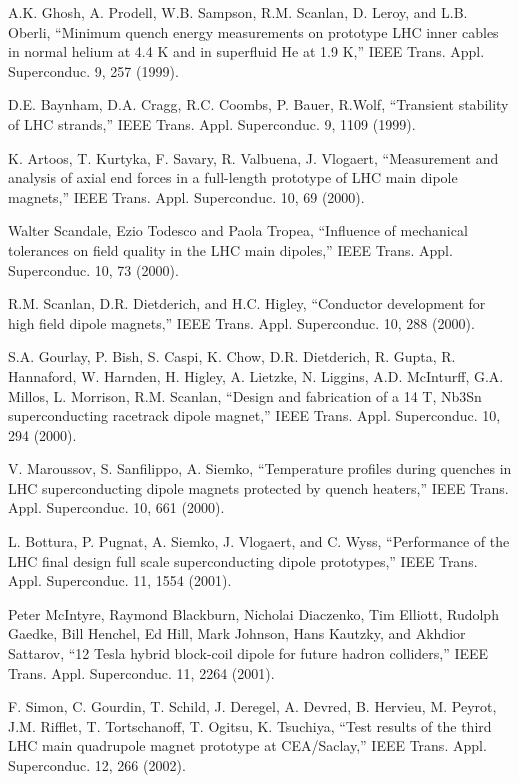 \noindent [9.318] A.K. Ghosh, A. Prodell, W.B. Sampson, R.M. Scanlan, D. Leroy, and L.B. Oberli,
``Minimum quench energy measurements on prototype LHC inner cables in normal
helium at 4.4 K and in superfluid He at 1.9 K,” IEEE Trans. Appl. Superconduc.
9, 257 (1999).

\noindent [9.319] D.E. Baynham, D.A. Cragg, R.C. Coombs, P. Bauer, R.Wolf, ``Transient stability
of LHC strands,” IEEE Trans. Appl. Superconduc. 9, 1109 (1999).

\noindent [9.320] K. Artoos, T. Kurtyka, F. Savary, R. Valbuena, J. Vlogaert, ``Measurement and
analysis of axial end forces in a full-length prototype of LHC main dipole magnets,” IEEE Trans. Appl. Superconduc. 10, 69 (2000).

\noindent [9.321] Walter Scandale, Ezio Todesco and Paola Tropea, ``Influence of mechanical tolerances
on field quality in the LHC main dipoles,” IEEE Trans. Appl. Superconduc.
10, 73 (2000).

\noindent [9.322] R.M. Scanlan, D.R. Dietderich, and H.C. Higley, ``Conductor development for
high field dipole magnets,” IEEE Trans. Appl. Superconduc. 10, 288 (2000).

\noindent [9.323] S.A. Gourlay, P. Bish, S. Caspi, K. Chow, D.R. Dietderich, R. Gupta, R. Hannaford,
W. Harnden, H. Higley, A. Lietzke, N. Liggins, A.D. McInturff, G.A. Millos, L.
Morrison, R.M. Scanlan, ``Design and fabrication of a 14 T, Nb3Sn superconducting
racetrack dipole magnet,” IEEE Trans. Appl. Superconduc. 10, 294 (2000).

\noindent [9.324] V. Maroussov, S. Sanfilippo, A. Siemko, ``Temperature profiles during quenches in
LHC superconducting dipole magnets protected by quench heaters,” IEEE Trans.
Appl. Superconduc. 10, 661 (2000).

\noindent [9.325] L. Bottura, P. Pugnat, A. Siemko, J. Vlogaert, and C. Wyss, ``Performance of
the LHC final design full scale superconducting dipole prototypes,” IEEE Trans.
Appl. Superconduc. 11, 1554 (2001).

\noindent [9.326] Peter McIntyre, Raymond Blackburn, Nicholai Diaczenko, Tim Elliott, Rudolph
Gaedke, Bill Henchel, Ed Hill, Mark Johnson, Hans Kautzky, and Akhdior Sattarov,
``12 Tesla hybrid block-coil dipole for future hadron colliders,” IEEE Trans.
Appl. Superconduc. 11, 2264 (2001).

\noindent [9.327] F. Simon, C. Gourdin, T. Schild, J. Deregel, A. Devred, B. Hervieu, M. Peyrot,
J.M. Rifflet, T. Tortschanoff, T. Ogitsu, K. Tsuchiya, ``Test results of the third
LHC main quadrupole magnet prototype at CEA/Saclay,” IEEE Trans. Appl.
Superconduc. 12, 266 (2002).

